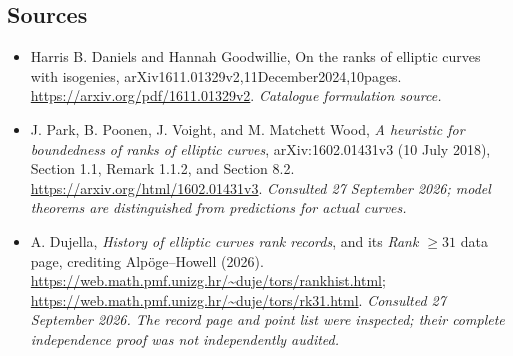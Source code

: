 \documentclass[11pt,a4paper]{article}
\numberwithin{equation}{section}
\begin{document}
\subsection{Sources}
\begin{itemize}\raggedright
\item[\textnormal{[S1]}]\hypertarget{source:statement:1}{} Harris B. Daniels and Hannah Goodwillie, On the ranks of elliptic curves with isogenies, arXiv1611.01329v2,11December2024,10pages.
\url{https://arxiv.org/pdf/1611.01329v2}.
{\small\textit{Catalogue formulation source.}}
\item[\textnormal{[E1]}]\hypertarget{extra:statement:1}{} J. Park, B. Poonen,
J. Voight, and M. Matchett Wood, \emph{A heuristic for boundedness of ranks
of elliptic curves}, arXiv:1602.01431v3 (10 July 2018),
Section 1.1, Remark 1.1.2, and Section 8.2.
\url{https://arxiv.org/html/1602.01431v3}.
{\small\textit{Consulted 27 September 2026; model theorems are distinguished from predictions for actual curves.}}
\item[\textnormal{[E2]}]\hypertarget{extra:statement:2}{} A. Dujella,
\emph{History of elliptic curves rank records}, and its
\emph{Rank $\geq31$} data page, crediting Alp\"oge--Howell (2026).
\url{https://web.math.pmf.unizg.hr/~duje/tors/rankhist.html};
\url{https://web.math.pmf.unizg.hr/~duje/tors/rk31.html}.
{\small\textit{Consulted 27 September 2026. The record page and point list were inspected; their complete independence proof was not independently audited.}}
\end{itemize}
\end{document}

